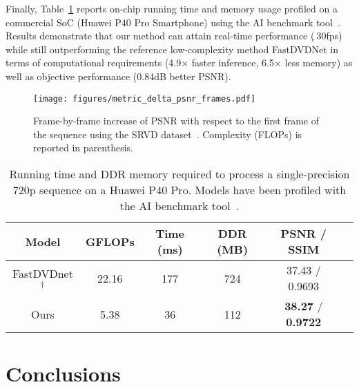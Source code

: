 \documentclass[final]{cvpr}
\newcommand{\textapprox}{$_{\widetilde{~}}$}
\begin{document}
    \indent Finally, Table~\ref{tab:soc_profiling} reports on-chip running time and memory usage profiled on a commercial SoC (Huawei P40 Pro Smartphone) using the AI benchmark tool~\cite{ignatov2019ai}. Results demonstrate that our method can attain real-time performance (\textapprox30fps) while still outperforming the reference low-complexity method FastDVDNet in terms of computational requirements (4.9$\times$ faster inference, 6.5$\times$ less memory) as well as objective performance (0.84dB better PSNR).
    

    \begin{figure}[t!]
        \centering
        \texttt{[image: figures/metric\_delta\_psnr\_frames.pdf]}
        \vspace{-0.1cm}
        \caption{Frame-by-frame increase of PSNR with respect to the first frame of the sequence using the SRVD dataset~\cite{chen2018sid,yue2020supervised}. Complexity (FLOPs) is reported in parenthesis.}
        \label{fig:psnr_frames}
        \vspace{0.2cm}
    \end{figure}
    
    \begin{table}[t]
        \centering
        \small
        \setlength{\tabcolsep}{1.75pt}
        \begin{tabular}{cccccc}
            \hline
            Model                & GFLOPs & Time (ms)& DDR (MB) & PSNR / SSIM                      \\
            \hline \hline
            FastDVDnet$^\dagger$ & 22.16  & 177      & 724      & 37.43 / 0.9693                   \\        
            \rowcolor{LightYellow}
            Ours                 & 5.38   & 36       & 112      & \textbf{38.27} / \textbf{0.9722} \\
         \hline
        \end{tabular}
        \caption{Running time and DDR memory required to process a single-precision 720p sequence on a Huawei P40 Pro. Models have been profiled with the AI benchmark tool~\cite{ignatov2019ai}.}
        \label{tab:soc_profiling}
    \end{table}

  
    \section{Conclusions}
    \label{section:conclusion}
\end{document}
